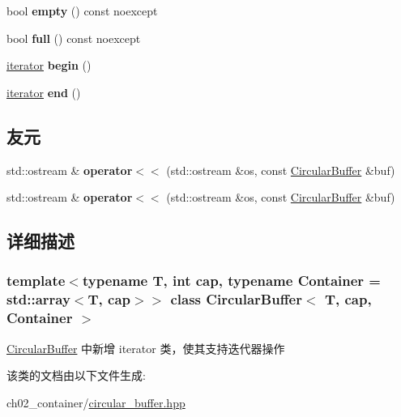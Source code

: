 \begin{DoxyCompactItemize}
bool {\bfseries empty} () const noexcept
\item 
\mbox{\label{class_circular_buffer_a08a7b5ef4f166a3c9edac00fd228b829}} 
bool {\bfseries full} () const noexcept
\item 
\mbox{\label{class_circular_buffer_a47cc0f94ec9777520e1af0c35998c836}} 
\mbox{\hyperlink{class_circular_buffer_1_1_circular_buffer_iterator}{iterator}} {\bfseries begin} ()
\item 
\mbox{\label{class_circular_buffer_a279006fdd3128eebf0ae3690d1862ab0}} 
\mbox{\hyperlink{class_circular_buffer_1_1_circular_buffer_iterator}{iterator}} {\bfseries end} ()
\end{DoxyCompactItemize}
\subsection*{友元}
\begin{DoxyCompactItemize}
\item 
\mbox{\label{class_circular_buffer_ace97e9f2ea4a42cac0f4908eeab66d96}} 
std\+::ostream \& {\bfseries operator$<$$<$} (std\+::ostream \&os, const \mbox{\hyperlink{class_circular_buffer}{Circular\+Buffer}} \&buf)
\item 
\mbox{\label{class_circular_buffer_ace97e9f2ea4a42cac0f4908eeab66d96}} 
std\+::ostream \& {\bfseries operator$<$$<$} (std\+::ostream \&os, const \mbox{\hyperlink{class_circular_buffer}{Circular\+Buffer}} \&buf)
\end{DoxyCompactItemize}


\subsection{详细描述}
\subsubsection*{template$<$typename T, int cap, typename Container = std\+::array$<$\+T, cap$>$$>$\newline
class Circular\+Buffer$<$ T, cap, Container $>$}

\mbox{\hyperlink{class_circular_buffer}{Circular\+Buffer}} 中新增 iterator 类，使其支持迭代器操作 

该类的文档由以下文件生成\+:\begin{DoxyCompactItemize}
\item 
ch02\+\_\+container/\mbox{\hyperlink{ch02__container_2circular__buffer_8hpp}{circular\+\_\+buffer.\+hpp}}\end{DoxyCompactItemize}
